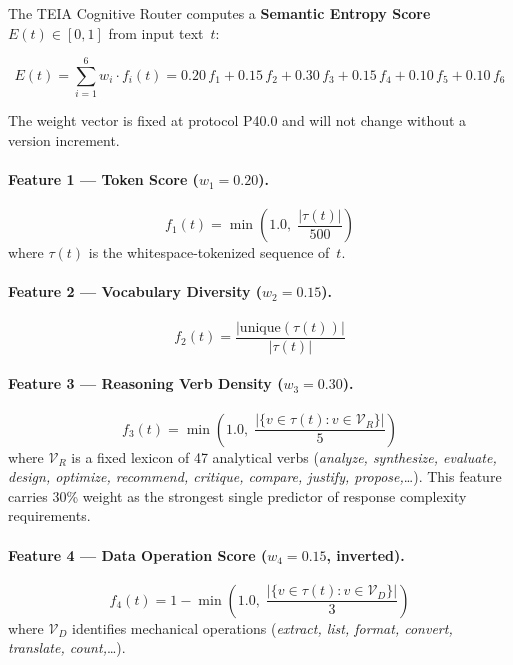 \documentclass[11pt,a4paper]{article}
\newcommand{\teia}{\textsc{TEIA}}
\begin{document}
The \teia{} Cognitive Router computes a \textbf{Semantic Entropy Score}
$E(t) \in [0,1]$ from input text~$t$:

\begin{equation}
  E(t) = \sum_{i=1}^{6} w_i \cdot f_i(t)
       = 0.20\,f_1 + 0.15\,f_2 + 0.30\,f_3
         + 0.15\,f_4 + 0.10\,f_5 + 0.10\,f_6
  \label{eq:entropy}
\end{equation}

The weight vector is fixed at protocol P40.0 and will not change without a version
increment.

\paragraph{Feature 1 --- Token Score ($w_1 = 0.20$).}
\begin{equation}
  f_1(t) = \min\!\left(1.0,\; \frac{|\tau(t)|}{500}\right)
\end{equation}
where $\tau(t)$ is the whitespace-tokenized sequence of~$t$.

\paragraph{Feature 2 --- Vocabulary Diversity ($w_2 = 0.15$).}
\begin{equation}
  f_2(t) = \frac{|\mathrm{unique}(\tau(t))|}{|\tau(t)|}
\end{equation}

\paragraph{Feature 3 --- Reasoning Verb Density ($w_3 = 0.30$).}
\begin{equation}
  f_3(t) = \min\!\left(1.0,\; \frac{|\{v \in \tau(t) : v \in \mathcal{V}_R\}|}{5}\right)
\end{equation}
where $\mathcal{V}_R$ is a fixed lexicon of 47 analytical verbs
(\textit{analyze, synthesize, evaluate, design, optimize, recommend,
critique, compare, justify, propose,}\ldots). This feature carries 30\% weight
as the strongest single predictor of response complexity requirements.

\paragraph{Feature 4 --- Data Operation Score ($w_4 = 0.15$, inverted).}
\begin{equation}
  f_4(t) = 1 - \min\!\left(1.0,\; \frac{|\{v \in \tau(t) : v \in \mathcal{V}_D\}|}{3}\right)
\end{equation}
where $\mathcal{V}_D$ identifies mechanical operations
(\textit{extract, list, format, convert, translate, count,}\ldots).
\end{document}
